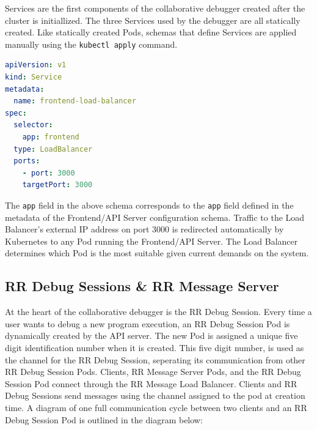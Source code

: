 \documentclass[12pt]{article}
\begin{document}
Services are the first components of the collaborative debugger
created after the cluster is initiallized.  The three Services used by
the debugger are all statically created.  Like statically created
Pods, schemas that define Services are applied manually using the
\lstinline{kubectl apply} command.\\

\begin{lstlisting}[language=YAML,basicstyle=\linespread{0.5}\ttfamily\small,caption={Frontend Load Balancer Schema},captionpos=b]
apiVersion: v1
kind: Service
metadata:
  name: frontend-load-balancer
spec:
  selector:
    app: frontend
  type: LoadBalancer
  ports:
    - port: 3000
    targetPort: 3000
\end{lstlisting}

The \lstinline{app} field in the above schema corresponds to the
\lstinline{app} field defined in the metadata of the Frontend/API
Server configuration schema.  Traffic to the Load Balancer's external
IP address on port 3000 is redirected automatically by Kubernetes to
any Pod running the Frontend/API Server.  The Load Balancer determines
which Pod is the most suitable given current demands on the system.

\subsection{RR Debug Sessions \& RR Message Server}

At the heart of the collaborative debugger is the RR Debug Session.
Every time a user wants to debug a new program execution, an RR Debug
Session Pod is dynamically created by the API server.  The new Pod is
assigned a unique five digit identification number when it is created.
This five digit number, is used as the channel for the RR Debug
Session, seperating its communication from other RR Debug Session
Pods.  Clients, RR Message Server Pods, and the RR Debug Session Pod
connect through the RR Message Load Balancer.  Clients and RR Debug
Sessions send messages using the channel assigned to the pod at
creation time.  A diagram of one full communication cycle between two
clients and an RR Debug Session Pod is outlined in the diagram below:
\end{document}
